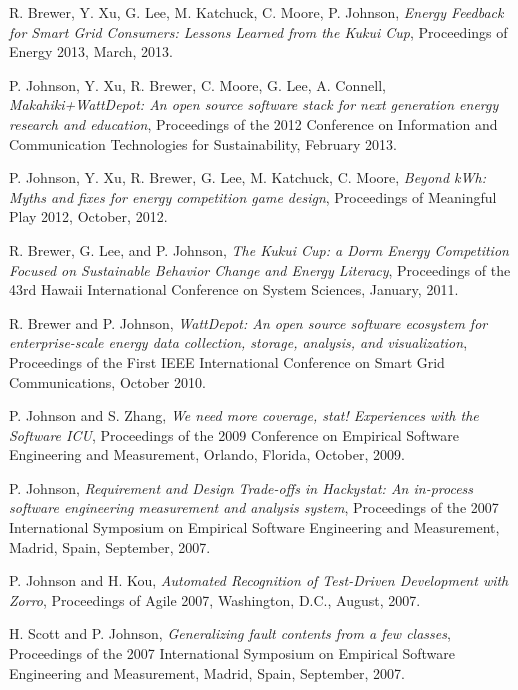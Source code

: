 \begin{Conference Publications}

\item R. Brewer, Y. Xu, G. Lee, M. Katchuck, C. Moore, P. Johnson, 
{\em Energy Feedback for Smart Grid Consumers: Lessons Learned from the Kukui Cup}, 
Proceedings of Energy 2013, March, 2013.

\item P. Johnson, Y. Xu, R. Brewer,  C. Moore,  G. Lee, A. Connell, 
{\em Makahiki+WattDepot: An open source software stack for next generation energy research
  and education}, 
Proceedings of the 2012 Conference on Information and Communication Technologies for
Sustainability, February 2013.

\item P. Johnson, Y. Xu, R. Brewer, G. Lee, M. Katchuck, C. Moore,
{\em Beyond kWh: Myths and fixes for energy competition game design}, 
Proceedings of Meaningful Play 2012, October, 2012.


\item R. Brewer, G. Lee, and P. Johnson, {\em The Kukui Cup: a Dorm Energy Competition Focused on Sustainable Behavior Change and Energy Literacy}, Proceedings of the 43rd Hawaii International Conference on System Sciences, January, 2011.

\item R. Brewer and P. Johnson, {\em WattDepot: An open source software ecosystem for enterprise-scale energy data collection, storage, analysis, and visualization}, Proceedings of the First IEEE International Conference on Smart Grid Communications, October 2010.

\item P. Johnson and S. Zhang, {\em We need more coverage, stat! Experiences with the Software ICU},
Proceedings of the 2009 Conference on Empirical Software Engineering and Measurement, Orlando, Florida, October, 2009.

\item P. Johnson, {\em Requirement and Design Trade-offs in Hackystat: An
in-process software engineering measurement and analysis system},
Proceedings of the 2007 International Symposium on Empirical Software
Engineering and Measurement, Madrid, Spain, September, 2007.

\item P. Johnson and H. Kou, {\em Automated Recognition of Test-Driven Development with Zorro}, 
Proceedings of Agile 2007, Washington, D.C., August, 2007. 

\item H. Scott and P. Johnson, {\em Generalizing fault contents from a few
classes}, Proceedings of the 2007 International Symposium on Empirical
Software Engineering and Measurement, Madrid, Spain, September, 2007.


\end{Conference Publications}

